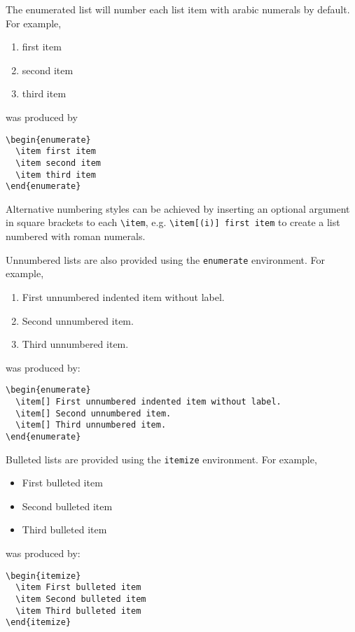 \documentclass{gCMB2e}
\begin{document}
The enumerated list will number each list item with arabic numerals by default. For example,
%
\begin{enumerate}
  \item first item
  \item second item
  \item third item
\end{enumerate}
%
was produced by
%
\begin{verbatim}
\begin{enumerate}
  \item first item
  \item second item
  \item third item
\end{enumerate}
\end{verbatim}
%
Alternative numbering styles can be achieved by inserting an optional argument in square brackets to each \verb"\item", e.g. \verb"\item[(i)] first item" to create a list numbered with roman numerals.

Unnumbered lists are also provided using the {\tt enumerate} environment. For example,
%
\begin{enumerate}
  \item[] First unnumbered indented item without label.
  \item[] Second unnumbered item.
  \item[] Third unnumbered item.
\end{enumerate}
%
was produced by:
%
\begin{verbatim}
\begin{enumerate}
  \item[] First unnumbered indented item without label.
  \item[] Second unnumbered item.
  \item[] Third unnumbered item.
\end{enumerate}
\end{verbatim}

Bulleted lists are provided using the {\tt itemize} environment. For example,
%
\begin{itemize}
  \item First bulleted item
  \item Second bulleted item
  \item Third bulleted item
\end{itemize}
%
was produced by:
%
\begin{verbatim}
\begin{itemize}
  \item First bulleted item
  \item Second bulleted item
  \item Third bulleted item
\end{itemize}
\end{verbatim}
\end{document}
